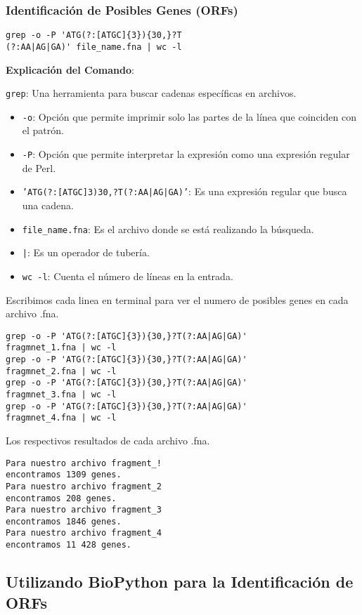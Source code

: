 \subsubsection*{Identificación de Posibles Genes (ORFs)}

\begin{verbatim}
grep -o -P 'ATG(?:[ATGC]{3}){30,}?T
(?:AA|AG|GA)' file_name.fna | wc -l
\end{verbatim}

\textbf{Explicación del Comando}:

\texttt{grep}: Una herramienta para buscar cadenas específicas en archivos.
\begin{itemize}
\item \texttt{-o}: Opción que permite imprimir solo las partes de la línea que coinciden con el patrón.
\item \texttt{-P}: Opción que permite interpretar la expresión como una expresión regular de Perl.
\item \texttt{'ATG(?:[ATGC]{3}){30,}?T(?:AA|AG|GA)'}: Es una expresión regular que busca una cadena.
\item \texttt{file\_name.fna}: Es el archivo donde se está realizando la búsqueda.
\item \texttt{|}: Es un operador de tubería.
\item \texttt{wc -l}: Cuenta el número de líneas en la entrada.
\end{itemize}

Escribimos cada linea en terminal para ver el numero de posibles genes en cada archivo .fna.
\begin{verbatim}
grep -o -P 'ATG(?:[ATGC]{3}){30,}?T(?:AA|AG|GA)'
fragmnet_1.fna | wc -l
grep -o -P 'ATG(?:[ATGC]{3}){30,}?T(?:AA|AG|GA)' 
fragmnet_2.fna | wc -l
grep -o -P 'ATG(?:[ATGC]{3}){30,}?T(?:AA|AG|GA)' 
fragmnet_3.fna | wc -l
grep -o -P 'ATG(?:[ATGC]{3}){30,}?T(?:AA|AG|GA)' 
fragmnet_4.fna | wc -l
\end{verbatim}

Los respectivos resultados de cada archivo .fna.
\begin{verbatim}
Para nuestro archivo fragment_! 
encontramos 1309 genes.
Para nuestro archivo fragment_2 
encontramos 208 genes.
Para nuestro archivo fragment_3 
encontramos 1846 genes.
Para nuestro archivo fragment_4 
encontramos 11 428 genes.
\end{verbatim}

\subsection*{Utilizando BioPython para la Identificación de ORFs}

